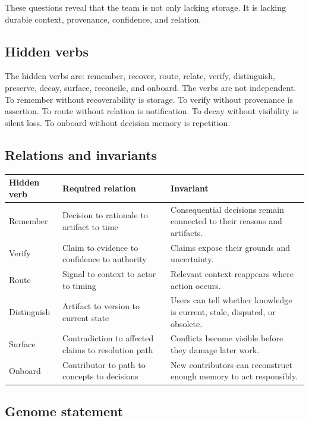 \documentclass[11pt]{article}
\begin{document}
These questions reveal that the team is not only lacking storage. It is lacking durable context, provenance, confidence, and relation.

\subsection{Hidden verbs}

The hidden verbs are: remember, recover, route, relate, verify, distinguish, preserve, decay, surface, reconcile, and onboard. The verbs are not independent. To remember without recoverability is storage. To verify without provenance is assertion. To route without relation is notification. To decay without visibility is silent loss. To onboard without decision memory is repetition.

\subsection{Relations and invariants}

\begin{longtable}{|p{}|p{}|p{}|}
\hline
\textbf{Hidden verb} & \textbf{Required relation} & \textbf{Invariant} \\
\hline
Remember & Decision to rationale to artifact to time & Consequential decisions remain connected to their reasons and artifacts. \\
\hline
Verify & Claim to evidence to confidence to authority & Claims expose their grounds and uncertainty. \\
\hline
Route & Signal to context to actor to timing & Relevant context reappears where action occurs. \\
\hline
Distinguish & Artifact to version to current state & Users can tell whether knowledge is current, stale, disputed, or obsolete. \\
\hline
Surface & Contradiction to affected claims to resolution path & Conflicts become visible before they damage later work. \\
\hline
Onboard & Contributor to path to concepts to decisions & New contributors can reconstruct enough memory to act responsibly. \\
\hline
\end{longtable}

\subsection{Genome statement}
\end{document}

